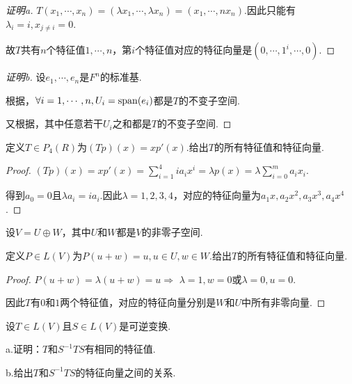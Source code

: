 \begin{proof}[证明a]
    \(T(x_1,\cdots,x_n)=(\lambda x_1,\cdots,\lambda x_n)=(x_1,\cdots,nx_n)\).因此只能有\(\lambda_i=i,x_{j \ne i}=0\).

    故\(T\)共有\(n\)个特征值\(1,\cdots,n\)，第\(i\)个特征值对应的特征向量是\((0,\cdots,1^i,\cdots,0)\).
\end{proof}

\begin{proof}[证明b]
    设\(e_1,\cdots,e_n\)是\(F^n\)的标准基.

    根据，\(\forall i=1,\cdots,n,U_i=\operatorname{span} (e_i)\)都是\(T\)的不变子空间.
    
    又根据，其中任意若干\(U_i\)之和都是\(T\)的不变子空间.
\end{proof}

\begin{problem}[12]\label{5.A.12}
    定义\(T \in P_4(R)\)为\((Tp)(x)=xp'(x)\).给出\(T\)的所有特征值和特征向量.
\end{problem}

\begin{proof}
    \((Tp)(x)=xp'(x)=\sum_{i=1}^4 ia_ix^i=\lambda p(x)=\lambda \sum_{i=0}^m a_ix_i\).

    得到\(a_0=0\)且\(\lambda a_i=i a_i\).因此\(\lambda=1,2,3,4\)，对应的特征向量为\(a_1x,a_2x^2,a_3x^3,a_4x^4\).
\end{proof}

\begin{problem}[14]\label{5.A.14}
    设\(V=U \oplus W\)，其中\(U\)和\(W\)都是\(V\)的非零子空间.

    定义\(P \in L(V)\)为\(P(u+w)=u,u \in U,w \in W\).给出\(T\)的所有特征值和特征向量.
\end{problem}

\begin{proof}
    \(P(u+w)=\lambda(u+w)=u \Rightarrow\) \(\lambda=1,w=0\)或\(\lambda=0,u=0\).

    因此\(T\)有\(0\)和\(1\)两个特征值，对应的特征向量分别是\(W\)和\(U\)中所有非零向量.
\end{proof}

\begin{problem}[15]\label{5.A.15}
    设\(T \in L(V)\)且\(S \in L(V)\)是可逆变换.

    a.证明：\(T\)和\(S^{-1}TS\)有相同的特征值.
    
    b.给出\(T\)和\(S^{-1}TS\)的特征向量之间的关系.
\end{problem}

